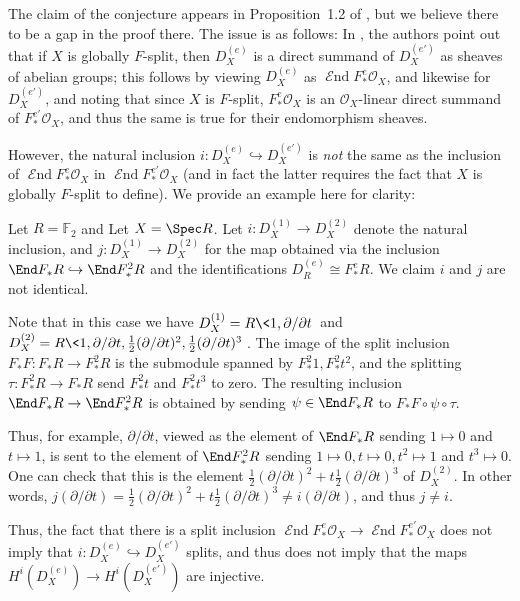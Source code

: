 \documentclass{article}
\def\O{\mathcal O}
\def\F{\mathcal F}
\numberwithin{equation}{section}
\let\d\partial
\theoremstyle{theorem}
\numberwithin{thm}{section}
\theoremstyle{definition}
\DeclareMathOperator{\SEnd}{\mathcal{E}nd}
\begin{document}
\begin{rem}
The claim of the conjecture appears in Proposition~1.2 of \cite{DaffineB2}, but we believe there to be a gap in the proof there. The issue is as follows: In \cite[1.1]{DaffineB2}, the authors point out that if $X$ is globally $F$-split, then $D^{(e)}_X$ is a direct summand of $D^{(e')}_X$ as sheaves of abelian groups; this follows by viewing $D^{(e)}_X$ as $\SEnd F_*^e \O_X$, and likewise for $D^{(e')}_X$, and noting that since $X$ is $F$-split, $F_*^e \O_X$ is an $\O_X$-linear direct summand of $F_*^{e'}\O_X$, and thus the same is true for their endomorphism sheaves.

However, the natural inclusion 
$i:D^{(e)}_X\hookrightarrow D^{(e')}_X$ is \emph{not} the same as the inclusion of $\SEnd F_*^e\O_X$ in $\SEnd F_*^{e'}\O_X$ (and in fact the latter requires the fact that $X$ is globally $F$-split to define).
We provide an example here for clarity:

\begin{exa}
\def\F{\mathbb F}
Let $R=\F_2$ and
Let $X=\Spec R$. %
Let $i:D^{(1)}_X\to D^{(2)}_X$ denote the natural inclusion, and $j:D^{(1)}_X \to D^{(2)}_X$ for the map obtained via the inclusion $\End F_*R \hookrightarrow \End F_*^2R$ and the identifications $D^{(e)}_R\cong F_*^e R$.
We claim $i$ and $j$ are not identical. 

Note that in this case we have 
$D^{(1)}_X=R\<1,\d/\d t\>$ and 
$D^{(2)}_X=R\<1,\d/\d t, \frac12 (\d/\d t)^2,\frac12 (\d/\d t)^3\>$.
The image of the split inclusion $F_*F: F_*R\to F_*^2R$ is the submodule spanned by $F_*^2 1,F_*^2 t^2$, and the splitting $\tau: F_*^2 R\to F_*R $ send $F^2_*t$ and $F^2_*t^3$ to zero.
The resulting inclusion  $\End F_* R\to \End F^2_* R$ is obtained by sending $\psi \in \End F_* R$ to $F_*F \circ \psi \circ \tau$.

Thus, for example, $\d/\d t$, viewed as the element of $\End F_*R$ sending $1\mapsto 0$ and $t\mapsto 1$, is sent to the element of $\End F_*^2R$ sending $1\mapsto 0, t\mapsto 0, t^2\mapsto 1$ and $t^3\mapsto 0$.  One can check that this is the element $\frac{1}{2} (\d/\d t)^2 +t \frac{1}{2} (\d/\d t)^3$ of $D^{(2)}_X$. In other words, $j(\d/\d t)=\frac{1}{2} (\d/\d t)^2 +t \frac{1}{2} (\d/\d t)^3\neq i(\d/ \d t)$, and thus $j\neq i$.
\end{exa}

Thus, the fact that there is a split inclusion $\SEnd F_*^e\O_X\to\SEnd F_*^{e'}\O_X$ does not imply that 
$i:D^{(e)}_X\hookrightarrow D^{(e')}_X$ splits, and thus does not imply that the maps $H^i(D^{(e)}_X) \to  H^i(D^{(e')}_X)$ are injective.
\end{rem}
\end{document}
